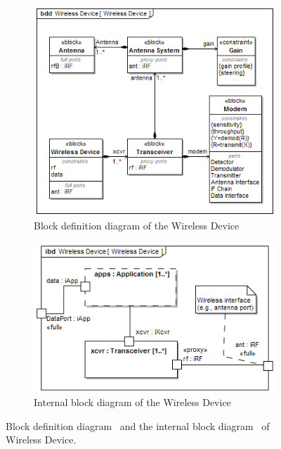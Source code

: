 \begin{figure}[ht]
	\centering
	
	\begin{subfigure}{.8\textwidth}
		\centering
		\includegraphics[width=.95\linewidth]{./chapter-sysml/diagrams/bdd__Wireless_Device__Wireless_Device}  
		\caption{Block definition diagram of the Wireless Device}
		\label{sysml:fig:wirelessdevice:bdd}
	\end{subfigure} 

	\begin{subfigure}{.8\textwidth}
		\centering
		\includegraphics[width=.95\linewidth]{./chapter-sysml/diagrams/ibd__Wireless_Device__Wireless_Device}  
		\caption{Internal block diagram of the Wireless Device}
		\label{sysml:fig:wirelessdevice:ibd}
	\end{subfigure}

	\caption{Block definition diagram~\protect{} and the internal block diagram~\protect{} of Wireless Device.}
	\label{sysml:fig:wirelessdevice:full}
\end{figure}


